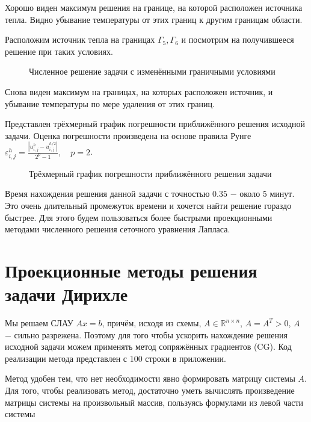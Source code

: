 \documentclass[a4paper, 12pt]{article} %
\begin{document}
Хорошо виден максимум решения на границе, на которой расположен источника тепла. Видно убывание температуры от этих границ к другим границам области. 

Расположим источник тепла на границах $ \Gamma_5, \Gamma_6 $ и посмотрим на получившееся решение при таких условиях.

\newpage

\begin{figure}[h]
\caption{Численное решение задачи с изменёнными граничными условиями}
\end{figure}

Снова виден максимум на границах, на которых расположен источник, и убывание температуры по мере удаления от этих границ.

Представлен трёхмерный график погрешности приближённого решения исходной задачи. Оценка погрешности произведена на основе правила Рунге $ \varepsilon_{i, j}^h = \frac{|u_{i, j}^{h} - u_{i, j}^{h / 2}|}{2^p - 1}, \quad p = 2  $.

\begin{figure}[h]
\caption{Трёхмерный график погрешности приближённого решения задачи}
\end{figure}

Время нахождения решения данной задачи с точностью $ 0.35 $ $ - $ около 5 минут. Это очень длительный промежуток времени и хочется найти решение гораздо быстрее. Для этого будем пользоваться более быстрыми проекционными методами численного решения сеточного уравнения Лапласа.

\newpage

\section{Проекционные методы решения задачи Дирихле}

Мы решаем СЛАУ $ Ax = b $, причём, исходя из схемы, $ A \in \mathds{R}^{n \times n} $, $ A = A^T > 0 $, $ A $ $ - $ сильно разрежена. Поэтому для того чтобы ускорить нахождение решения исходной задачи можем применять метод сопряжённых градиентов (CG). Код реализации метода представлен с 100 строки в приложении.

Метод удобен тем, что нет необходимости явно формировать матрицу системы $ A $. Для того, чтобы реализовать метод, достаточно уметь вычислять произведение матрицы системы на произвольный массив, пользуясь формулами из левой части системы  
\end{document}
